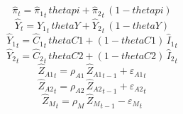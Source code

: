 \begin{dmath}
{{\hat{\pi}}}_{t}={{\hat{\pi}_{1}}}_{t}\, {thetapi}+{{\hat{\pi}_{2}}}_{t}\, \left(1-{thetapi}\right)
\end{dmath}
\begin{dmath}
{{\hat{Y}}}_{t}={{\hat{Y}_{1}}}_{t}\, {thetaY}+{{\hat{Y}_{2}}}_{t}\, \left(1-{thetaY}\right)
\end{dmath}
\begin{dmath}
{{\hat{Y}_{1}}}_{t}={{\hat{C}_{1}}}_{t}\, {thetaC1}+\left(1-{thetaC1}\right)\, {{\hat{I}_{1}}}_{t}
\end{dmath}
\begin{dmath}
{{\hat{Y}_{2}}}_{t}={{\hat{C}_{2}}}_{t}\, {thetaC2}+\left(1-{thetaC2}\right)\, {{\hat{I}_{2}}}_{t}
\end{dmath}
\begin{dmath}
{{\hat{Z}_{A1}}}_{t}={{\rho_{A1}}}\, {{\hat{Z}_{A1}}}_{t-1}+{{\varepsilon_{A1}}}_{t}
\end{dmath}
\begin{dmath}
{{\hat{Z}_{A2}}}_{t}={{\rho_{A2}}}\, {{\hat{Z}_{A2}}}_{t-1}+{{\varepsilon_{A2}}}_{t}
\end{dmath}
\begin{dmath}
{{\hat{Z}_M}}_{t}={{\rho_{M}}}\, {{\hat{Z}_M}}_{t-1}-{{\varepsilon_{M}}}_{t}
\end{dmath}
